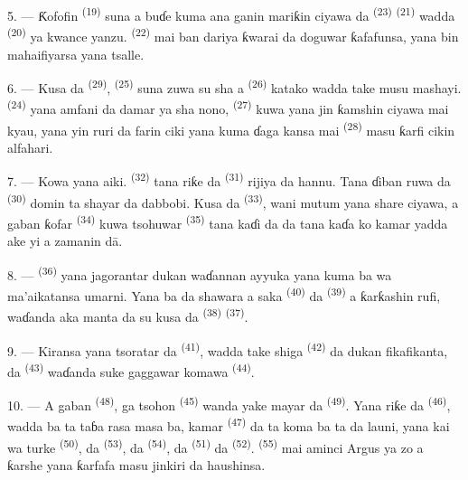 5. --- Ƙofofin  \textsuperscript{(19)} suna a buɗe
kuma ana ganin mariƙin ciyawa da 
\textsuperscript{(23)}  \textsuperscript{(21)} wadda
 \textsuperscript{(20)} ya kwance yanzu.
 \textsuperscript{(22)} mai ban dariya ƙwarai da
doguwar ƙafafunsa, yana bin mahaifiyarsa yana tsalle.

6. --- Kusa da  \textsuperscript{(29)}, 
\textsuperscript{(25)} suna zuwa su sha a 
\textsuperscript{(26)} katako wadda take musu mashayi. 
\textsuperscript{(24)} yana amfani da damar ya sha nono, 
\textsuperscript{(27)} kuwa yana jin ƙamshin ciyawa mai kyau, yana yin
ruri da farin ciki yana kuma ɗaga kansa mai 
\textsuperscript{(28)} masu ƙarfi cikin alfahari.

7. --- Kowa yana aiki.  \textsuperscript{(32)}
tana riƙe da  \textsuperscript{(31)} rijiya da hannu.
Tana ɗiban ruwa da  \textsuperscript{(30)} domin ta shayar
da dabbobi. Kusa da  \textsuperscript{(33)},
wani mutum yana share ciyawa, a gaban ƙofar 
\textsuperscript{(34)} kuwa tsohuwar 
\textsuperscript{(35)} tana kaɗi da  da
 tana kaɗa  ko  kamar yadda
ake yi a zamanin dā.

\VUsaut{3.0mm}
\VUsaut{3.0mm}

8. ---  \textsuperscript{(36)} yana jagorantar dukan
waɗannan ayyuka yana kuma ba wa ma’aikatansa umarni. Yana ba da
shawara a saka  \textsuperscript{(40)} da
 \textsuperscript{(39)} a ƙarƙashin rufi, waɗanda aka
manta da su kusa da  \textsuperscript{(38)}
 \textsuperscript{(37)}.

9. --- Kiransa yana tsoratar da 
\textsuperscript{(41)}, wadda take shiga 
\textsuperscript{(42)} da dukan fikafikanta, da 
\textsuperscript{(43)} waɗanda suke gaggawar komawa 
\textsuperscript{(44)}.

10. --- A gaban  \textsuperscript{(48)}, ga
tsohon  \textsuperscript{(45)} wanda yake mayar da
 \textsuperscript{(49)}. Yana riƙe da 
\textsuperscript{(46)}, wadda ba ta taɓa rasa masa ba, kamar
 \textsuperscript{(47)} da ta koma ba ta da
launi, yana kai wa turke  \textsuperscript{(50)}, da
 \textsuperscript{(53)}, da 
\textsuperscript{(54)}, da  \textsuperscript{(51)} da
 \textsuperscript{(52)}. 
\textsuperscript{(55)} mai aminci Argus ya zo a ƙarshe yana
ƙarfafa masu jinkiri da haushinsa.

